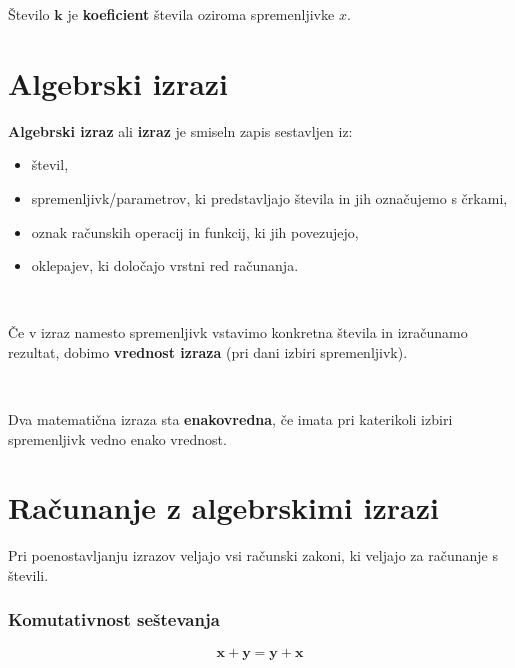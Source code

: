                 Število $\mathbf{k}$ je \textbf{koeficient} števila oziroma spremenljivke $x$.
            
        
    
        \section{Algebrski izrazi}
    
        
    
            
                \textbf{Algebrski izraz} ali \textbf{izraz} je smiseln zapis sestavljen iz:
                \begin{itemize}
                    \item števil,
                    \item spremenljivk/parametrov, ki predstavljajo števila in jih označujemo s črkami,
                    \item oznak računskih operacij in funkcij, ki jih povezujejo,
                    \item oklepajev, ki določajo vrstni red računanja. 
                \end{itemize}
            ~
    
            
                Če v izraz namesto spremenljivk vstavimo konkretna števila in izračunamo rezultat, dobimo \textbf{vrednost izraza} (pri dani izbiri spremenljivk).
    
            ~
    
            
                Dva matematična izraza sta \textbf{enakovredna}, če imata pri katerikoli izbiri spremenljivk vedno enako vrednost.
    
            
        
    
        
        \section{Računanje z algebrskimi izrazi}
    
    
    
        
            
                Pri poenostavljanju izrazov veljajo vsi računski zakoni, ki veljajo za računanje s števili.
            
    
                \subsubsection*{Komutativnost seštevanja}
                    $$ \mathbf{x+ y=y+ x}$$
                
